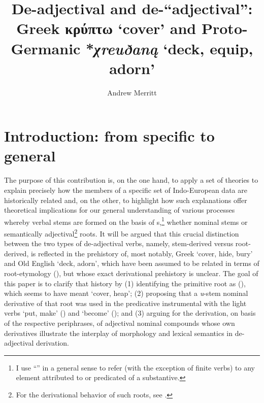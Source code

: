 \documentclass[output=paper,colorlinks,citecolor=brown]{langscibook}
\author{Andrew Merritt\affiliation{Georgetown University}}
\title{De-adjectival and de-``adjectival'': Greek κρύπτω `cover' and Proto-Germanic *\textit{χreuðaną} `deck, equip, adorn'}
\begin{document}
\maketitle





\section{Introduction: from specific to general}

The purpose of this contribution is, on the one hand, to apply a set of theories to explain precisely how the members of a specific set of Indo-European data are historically related and, on the other, to highlight how such explanations offer theoretical implications for our general understanding of various processes whereby verbal stems are formed on the basis of s,\footnote{I use “” in a general sense to refer (with the exception of finite verbs) to any element attributed to or predicated of a substantive.} whether nominal stems or semantically adjectival\footnote{For the derivational behavior of such roots, see \citealt{Nussbaum2022}.} roots. It will be argued that this crucial distinction between the two types of de-adjectival verbs, namely, stem-derived versus root-derived, is reflected in the prehistory of, most notably, Greek  ‘cover, hide, bury’ and Old English  ‘deck, adorn’, which have been assumed to be related in terms of root-etymology (), but whose exact derivational prehistory is unclear. The goal of this paper is to clarify that history by (1) identifying the primitive root as  (), which seems to have meant ‘cover, heap’; (2) proposing that a \textit{u}{}-stem nominal derivative of that root was used in the predicative instrumental  with the light verbs  ‘put, make’ () and  ‘become’ (); and (3)  arguing for the derivation, on basis of the respective periphrases, of adjectival nominal compounds whose own derivatives illustrate the interplay of morphology and lexical semantics in de-adjectival derivation. 
\end{document}
